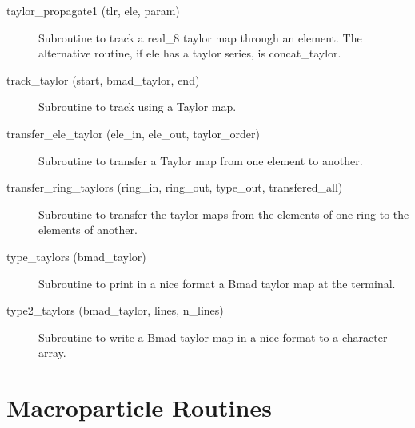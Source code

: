 \begin{description}
\item[taylor\_propagate1 (tlr, ele, param)] \Newline
Subroutine to track a real\_8 taylor map through an element. 
The alternative routine, if ele has a taylor series, is concat\_taylor. 

\item[track\_taylor (start, bmad\_taylor, end)] \Newline
Subroutine to track using a Taylor map. 

\item[transfer\_ele\_taylor (ele\_in, ele\_out, taylor\_order)] \Newline 
Subroutine to transfer a Taylor map from one element to another.

\item[transfer\_ring\_taylors (ring\_in, ring\_out, 
                                             type\_out, transfered\_all) ] \Newline 
Subroutine to transfer the taylor maps from the elements of one ring to
the elements of another. 

\item[type\_taylors (bmad\_taylor)] \Newline
Subroutine to print in a nice format a Bmad taylor map at the terminal. 

\item[type2\_taylors (bmad\_taylor, lines, n\_lines)] \Newline
Subroutine to write a Bmad taylor map in a nice format to a character array. 

\end{description}

\section{Macroparticle Routines}
\label{r:macro}    

